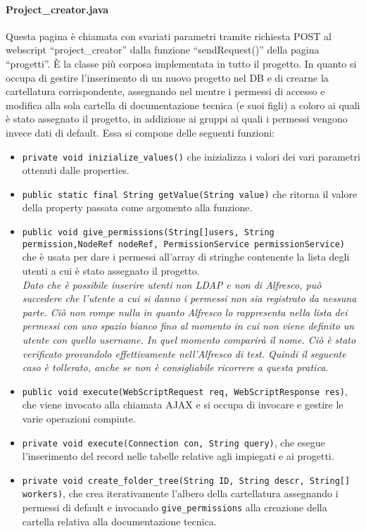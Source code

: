 \paragraph{Project\_creator.java}
Questa pagina è chiamata con svariati parametri tramite richiesta POST al webscript “project\_creator” dalla funzione “sendRequest()” della pagina “progetti”. È la classe più corposa implementata in tutto il progetto. In quanto si occupa di gestire l’inserimento di un nuovo progetto nel DB e di crearne la cartellatura corrispondente, assegnando nel mentre i permessi di accesso e modifica alla sola cartella di documentazione tecnica (e suoi figli) a coloro ai quali è stato assegnato il progetto, in addizione ai gruppi ai quali i permessi vengono invece dati di default.
Essa si compone delle seguenti funzioni:
\begin{itemize}
\item \texttt{private void inizialize\_values()} che inizializza i valori dei vari parametri ottenuti dalle properties.
\item \texttt{public static final String getValue(String value)} che ritorna il valore della property passata come argomento alla funzione.
\item \texttt{public void give\_permissions(String[]users, String permission,NodeRef nodeRef, PermissionService permissionService)} che è usata per dare i permessi all’array di stringhe contenente la lista degli utenti a cui è stato assegnato il progetto.\\
\emph{Dato che è possibile inserire utenti non LDAP e non di Alfresco, può succedere che l’utente a cui si danno i permessi non sia registrato da nessuna parte. Ciò non rompe nulla in quanto Alfresco lo rappresenta nella lista dei permessi con uno spazio bianco fino al momento in cui non viene definito un utente con quello username. In quel momento comparirà il nome. Ciò è stato verificato provandolo effettivamente nell’Alfresco di test. Quindi il seguente caso è tollerato, anche se non è consigliabile ricorrere a questa pratica.}
\item \texttt{public void execute(WebScriptRequest req, WebScriptResponse res)}, che viene invocato alla chiamata AJAX e si occupa di invocare e gestire le varie operazioni compiute.
\item \texttt{private void execute(Connection con, String query)}, che esegue l’inserimento del record nelle tabelle relative agli impiegati e ai progetti.
\item \texttt{private void create\_folder\_tree(String ID, String descr, String[] workers)}, che crea iterativamente l’albero della cartellatura assegnando i permessi di default e invocando \texttt{give\_permissions} alla creazione della cartella relativa alla documentazione tecnica.
\end{itemize}
